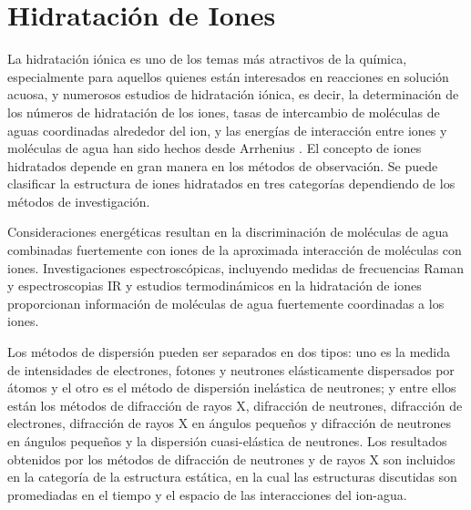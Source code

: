 \section{Hidrataci\'on de Iones}
La hidrataci\'on i\'onica es uno
de los temas m\'as atractivos de la qu\'imica, especialmente para 
aquellos quienes est\'an interesados en reacciones en soluci\'on 
acuosa, y numerosos estudios de hidrataci\'on i\'onica, es decir, la 
determinaci\'on de los n\'umeros de hidrataci\'on de los iones, tasas
de intercambio de mol\'eculas de aguas coordinadas alrededor del ion,
y las energ\'ias de interacci\'on entre iones y mol\'eculas de agua 
han sido hechos desde Arrhenius \citep{Ohta1993}. El concepto de 
iones hidratados depende en gran manera en los m\'etodos de 
observaci\'on. Se puede clasificar la estructura de iones hidratados 
en tres categor\'ias dependiendo de los m\'etodos de investigaci\'on.

Consideraciones 
energ\'eticas resultan en la discriminaci\'on de mol\'eculas de agua
combinadas fuertemente con iones de la aproximada interacci\'on de 
mol\'eculas con iones. Investigaciones espectrosc\'opicas, incluyendo
medidas de frecuencias Raman y espectroscopias IR y estudios 
termodin\'amicos en la hidrataci\'on de iones proporcionan 
informaci\'on de mol\'eculas de agua fuertemente coordinadas a los 
iones.

Los m\'etodos de dispersi\'on pueden ser separados en dos tipos: uno 
es la medida de intensidades de electrones, fotones y neutrones 
el\'asticamente dispersados por \'atomos y el otro es el m\'etodo de 
dispersi\'on inel\'astica de neutrones; y entre ellos est\'an los 
m\'etodos de difracci\'on de rayos X, difracci\'on de neutrones, 
difracci\'on de electrones, difracci\'on de rayos X en \'angulos 
peque\~nos y difracci\'on de neutrones en \'angulos peque\~nos y la 
dispersi\'on cuasi-el\'astica de neutrones. Los resultados obtenidos 
por los m\'etodos de difracci\'on de neutrones y de rayos X son 
incluidos en la categor\'ia de la estructura est\'atica, en la cual 
las estructuras discutidas son promediadas en el tiempo y el espacio 
de las interacciones del ion-agua. 

